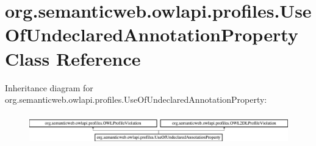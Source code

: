 \hypertarget{classorg_1_1semanticweb_1_1owlapi_1_1profiles_1_1_use_of_undeclared_annotation_property}{\section{org.\-semanticweb.\-owlapi.\-profiles.\-Use\-Of\-Undeclared\-Annotation\-Property Class Reference}
\label{classorg_1_1semanticweb_1_1owlapi_1_1profiles_1_1_use_of_undeclared_annotation_property}
}
Inheritance diagram for org.\-semanticweb.\-owlapi.\-profiles.\-Use\-Of\-Undeclared\-Annotation\-Property\-:\begin{figure}[H]
\begin{center}
\leavevmode
\includegraphics[height=1.352657cm]{classorg_1_1semanticweb_1_1owlapi_1_1profiles_1_1_use_of_undeclared_annotation_property}
\end{center}
\end{figure}
